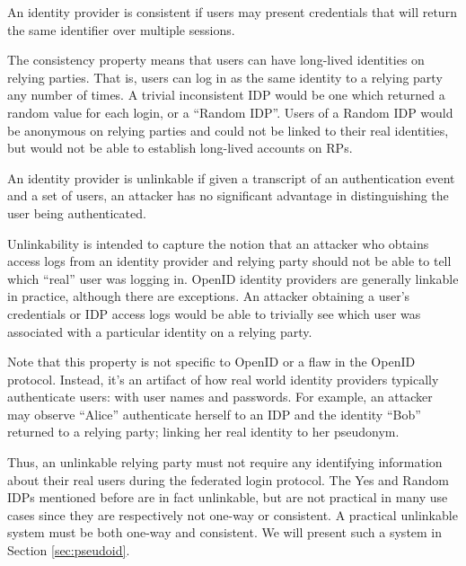 \documentclass{llncs}
\begin{document}
\begin{definition}[Consistency]
\label{def:consistency}
An identity provider is consistent if users may present credentials
that will return the same identifier over multiple sessions.
\end{definition}

The consistency property means that users can have long-lived
identities on relying parties. That is, users can log in as the same
identity to a relying party any number of times. A trivial
inconsistent IDP would be one which returned a random value for each
login, or a ``Random IDP''. Users of a Random IDP would be anonymous
on relying parties and could not be linked to their real identities,
but would not be able to establish long-lived accounts on RPs.

\begin{definition}[Unlinkability]
\label{def:unlinkability}
An identity provider is unlinkable if given a transcript of an
authentication event and a set of users, an attacker has no
significant advantage in distinguishing the user being authenticated.
\end{definition}

Unlinkability is intended to capture the notion that an attacker who
obtains access logs from an identity provider and relying party should
not be able to tell which ``real'' user was logging in. OpenID
identity providers are generally linkable in practice, although there
are exceptions. An attacker obtaining a user's credentials or IDP
access logs would be able to trivially see which user was associated
with a particular identity on a relying party.

Note that this property is not specific to OpenID or a flaw in the
OpenID protocol. Instead, it's an artifact of how real world identity
providers typically authenticate users: with user names and
passwords. For example, an attacker may observe ``Alice'' authenticate
herself to an IDP and the identity ``Bob'' returned to a relying
party; linking her real identity to her pseudonym.

Thus, an unlinkable relying party must not require any identifying
information about their real users during the federated login
protocol. The Yes and Random IDPs mentioned before are in fact
unlinkable, but are not practical in many use cases since they are
respectively not one-way or consistent. A practical unlinkable system
must be both one-way and consistent. We will present such a system in
Section \ref{sec:pseudoid}.
\end{document}
